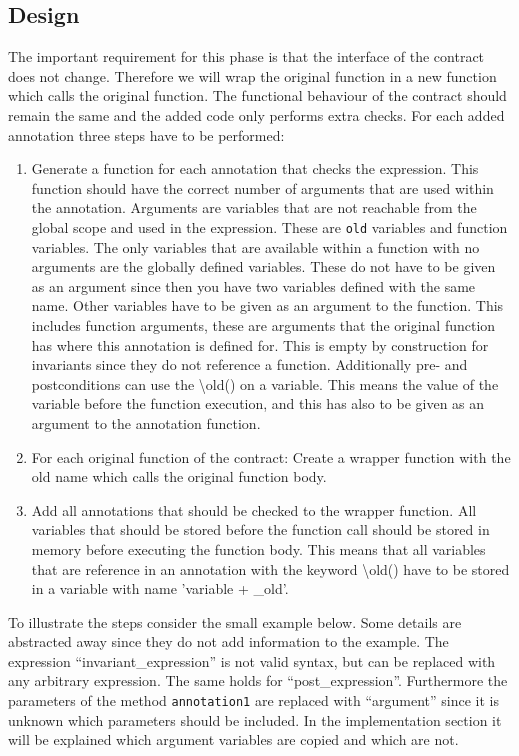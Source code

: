 \documentclass[a4paper]{article}
\begin{document}
\subsection{Design}
The important requirement for this phase is that the interface of the contract does not change. Therefore we will wrap the original function in a new function which calls the original function. The functional behaviour of the contract should remain the same and the added code only performs extra checks. For each added annotation three steps have to be performed:
\begin{enumerate}
  \item Generate a function for each annotation that checks the expression. This function should have the correct number of arguments that are used within the annotation. Arguments are variables that are not reachable from the global scope and used in the expression. These are \texttt{old} variables and function variables. The only variables that are available within a function with no arguments are the globally defined variables. These do not have to be given as an argument since then you have two variables defined with the same name. Other variables have to be given as an argument to the function. This includes function arguments, these are arguments that the original function has where this annotation is defined for. This is empty by construction for invariants since they do not reference a function. Additionally pre- and postconditions can use the \textbackslash old() on a variable. This means the value of the variable before the function execution, and this has also to be given as an argument to the annotation function.
  \item For each original function of the contract: Create a wrapper function with the old name which calls the original function body.
  \item Add all annotations that should be checked to the wrapper function. All variables that should be stored before the function call should be stored in memory before executing the function body. This means that all variables that are reference in an annotation with the keyword \textbackslash old() have to be stored in a variable with name 'variable + \_old'.
\end{enumerate}
To illustrate the steps consider the small example below. Some details are abstracted away since they do not add information to the example. The expression ``invariant\_expression'' is not valid syntax, but can be replaced with any arbitrary expression. The same holds for ``post\_expression''. Furthermore the parameters of the method \texttt{annotation1} are replaced with ``argument'' since it is unknown which parameters should be included. In the implementation section it will be explained which argument variables are copied and which are not.
\end{document}
